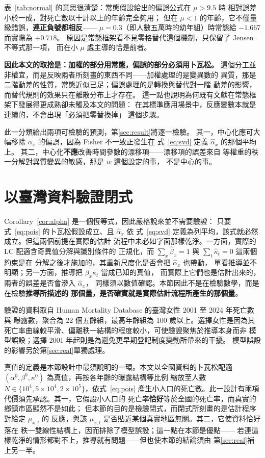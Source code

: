 \documentclass[UTF8, fontset=macnew, a4paper, 12pt]{ctexart}
\begin{document}
表~\ref{tab:normal} 的意思很清楚：常態假設給出的偏誤公式在 $\mu>9.5$ 時
相對誤差小於一成，對死亡數以十計以上的年齡完全夠用；
但在 $\mu<1$ 的年齡，它不僅量級錯誤，\textbf{連正負號都相反}——
$\mu=0.3$（即人數五萬時的幼年組）時常態給 $-1.667$ 而實際為 $+0.718$。
原因是常態框架看不見零格替代這個機制，只保留了 Jensen 不等式那一項，
而在小 $\mu$ 處主導的恰是前者。

\textbf{因此本文的取捨是：加權的部分用常態，偏誤的部分必須用卜瓦松。}
這個分工並非權宜，而是反映兩者所刻畫的東西不同——加權處理的是變異數的
異質，那是二階動差的性質，常態近似已足；偏誤處理的是轉換與替代對一階
動差的影響，而替代規則的效果只在離散分布上才存在。
這一點也說明為何既有文獻在常態框架下發展得更成熟卻未觸及本文的問題：
在其標準應用場景中，反應變數本就是連續的，不會出現「必須把零替換掉」
這個步驟。

此一分類給出兩項可檢驗的預測，第\ref{sec:result}將逐一檢驗。
其一，中心化應可大幅移除 $\alpha_x$ 的偏誤，因為 Fisher 不一致正發生在
式~\eqref{eq:svd} 定義 $\hat\alpha_x$ 的那個平均上。
其二，中心化\textbf{不應}改善時間參數的漂移項——漂移項的誤差來自
等權重的秩一分解對異質變異的敏感，那是 $w$ 這個設定的事，
不是中心的事。

\section{以臺灣資料驗證閉式}\label{sec:valid}

Corollary~\ref{cor:alpha} 是一個恆等式，因此嚴格說來並不需要驗證：
只要式~\eqref{eq:pois} 的卜瓦松假設成立、且 $\hat\alpha_x$ 依
式~\eqref{eq:svd} 定義為列平均，該式就必然成立。但這兩個前提在實際的估計
流程中未必如字面那樣乾淨。一方面，實際的 LC 配適含奇異值分解與識別條件的
正規化，而 $\sum_x\hat\beta_x=1$ 與 $\sum_t\hat\kappa_t=0$ 這兩個約束是在
分解之後才施加的，其重新尺度化是否會把 $\hat\alpha_x$ 也帶動，
單看推導並不明顯；另一方面，推導把 $\beta_x\kappa_t$ 當成已知的真值，
而實際上它們也是估計出來的，兩者的誤差是否會滲入 $\hat\alpha_x$，
同樣須以數值確認。本節因此不是在檢驗數學，而是在檢驗\textbf{推導所描述的
那個量，是否確實就是實際估計流程所產生的那個量}。

驗證的資料取自 Human Mortality Database 的臺灣女性 2001 至 2024 年死亡數與
曝露數，聚合為 22 個五齡組，最高年齡組為 100 歲以上。選擇女性是因為其
死亡率曲線較平滑、偏離秩一結構的程度較小，可使驗證聚焦於推導本身而非
模型誤設；選擇 2001 年起則是為避免更早期登記制度變動所帶來的干擾。
模型誤設的影響另於第\ref{sec:real}單獨處理。

真值的定義是本節設計中最須說明的一環。本文以全國資料的卜瓦松配適
$(\alpha^{0},\beta^{0},\kappa^{0})$ 為真值，再按各年齡的曝露結構等比例
縮放至人數 $N\in\{10^4,5\times10^4,2\times10^5\}$，依式~\eqref{eq:pois}
產生小人口的死亡數。此一設計有兩項代價須先承認。其一，它假設小人口的
死亡率\textbf{恰好}等於全國的死亡率，而真實的鄉鎮市區顯然不是如此；
但本節的目的是檢驗閉式，而閉式所刻畫的是估計程序對給定 $\mu_{x,t}$ 的
反應，與該 $\mu_{x,t}$ 是否貼近某個真實地區無關。其二，它使資料恰好落在
秩一雙線性結構上，因而排除了模型誤設；這一點在本節是優點——
若連這樣乾淨的情形都對不上，推導就有問題——但也使本節的結論須由
第\ref{sec:real}補上另一半。
\end{document}
